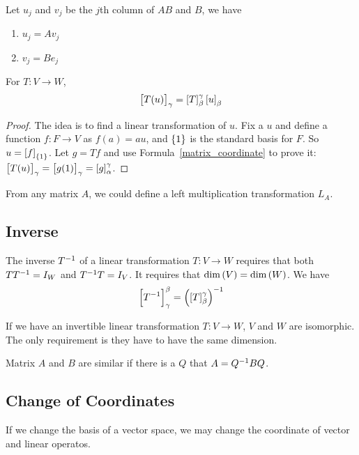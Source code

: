 Let $u_j$ and $v_j$ be the $j$th column of $AB$ and $B$, we have
\begin{enumerate}
    \item $u_j = A v_j$
    \item $v_j = B e_j$
\end{enumerate}

\begin{theorem}
    For $T: V \rightarrow W$,
    \begin{equation}
        \coordinate{T(u)}_\gamma = \coordinate{T}_{\beta}^{\gamma} \coordinate{u}_{\beta}
    \end{equation}    
\end{theorem}
\begin{proof}
    The idea is to find a linear transformation of $u$. Fix a $u$ and define a function $f: F \rightarrow V$ as $f(a) = au$, and $\set{1}$ is the standard basis for $F$. So $u = \coordinate{f}_{\set{1}}$. Let $g=Tf$ and use Formula~\ref{matrix_coordinate} to prove it: $\coordinate{T(u)}_\gamma = \coordinate{g(1)}_\gamma = \coordinate{g}_{\alpha}^{\gamma}$.
\end{proof}

From any matrix $A$, we could define a left multiplication transformation $L_A$.


\subsection{Inverse}
The inverse ${T}^{-1}$ of a linear transformation $T:V \rightarrow W$ requires that both $T {T}^{-1} = I_W$ and ${T}^{-1} T = I_V$. It requires that $\displaystyle \mathrm{dim}\left( V \right) = \displaystyle \mathrm{dim}\left( W \right)$. We have
\begin{equation}
    \coordinate{\inverse{T}}_{\gamma}^{\beta} = \inverse{\left( \coordinate{T}_{\beta}^{\gamma} \right)}
\end{equation}

If we have an invertible linear transformation $T:V \rightarrow W$, $V$ and $W$ are isomorphic. The only requirement is they have to have the same dimension.

Matrix $A$ and $B$ are similar if there is a $Q$ that $A = {Q}^{-1} B Q$.



\subsection{Change of Coordinates}

If we change the basis of a vector space, we may change the coordinate of vector and linear operatos.

